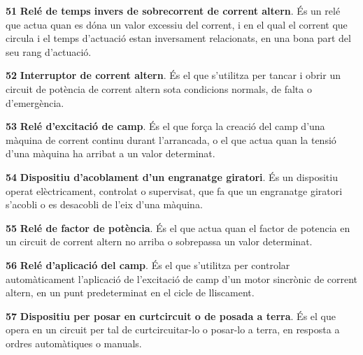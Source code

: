 \begin{multicols}{2}
\begin{list}{}
\item[\textbf{51}]  
\textbf{Relé de temps invers  de sobrecorrent de corrent altern}. És
un relé que actua quan es dóna un valor excessiu del corrent, i en el qual el corrent que circula i el temps d'actuació estan inversament relacionats, en una bona part del seu rang d'actuació.

\item[\textbf{52}]   
\textbf{Interruptor de corrent altern}. És
 el que s'utilitza per tancar i obrir un circuit de potència de corrent altern sota condicions
normals, de falta o d'emergència.

\item[\textbf{53}]  
\textbf{Relé d'excitació de camp}. És el
que força la creació del camp d'una màquina de corrent continu
durant l'arrancada, o el que actua quan la tensió d'una màquina ha
arribat a un valor determinat.

\item[\textbf{54}]  
\textbf{Dispositiu d'acoblament d'un engranatge giratori}. És un dispositiu operat elèctricament, controlat o supervisat, que fa que un engranatge giratori
s'acobli o es desacobli de l'eix d'una màquina.

\item[\textbf{55}]   
\textbf{Relé de factor de potència}. És el que actua quan el factor de potencia en un circuit de corrent altern no arriba o
sobrepassa un valor determinat.

\item[\textbf{56}]   
\textbf{Relé d'aplicació del camp}.
És el que s'utilitza per controlar automàticament l'aplicació de l'excitació de camp d'un
motor sincrònic de corrent altern, en un punt predeterminat en el cicle de lliscament.

\item[\textbf{57}]  
\textbf{Dispositiu per posar en  curtcircuit o de posada a terra}. És el que
opera en un circuit per tal de curtcircuitar-lo  o
posar-lo a terra, en resposta a ordres automàtiques o manuals.


\end{list}
\end{multicols}
